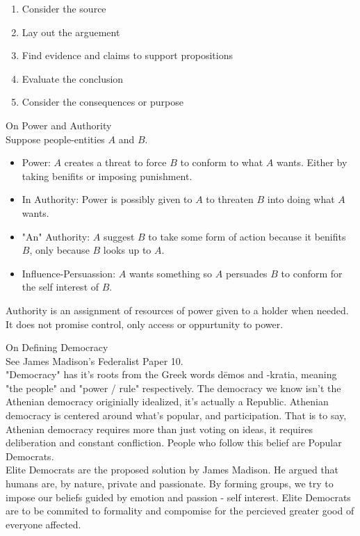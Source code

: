 \documentclass{article}
\begin{document}
\begin{enumerate}
  \item Consider the source
  \item Lay out the arguement
  \item Find evidence and claims to support propositions
  \item Evaluate the conclusion
  \item Consider the consequences or purpose
\end{enumerate}

\noindent
\Large On Power and Authority\\
\normalsize
\noindent
Suppose people-entities $A$ and $B$.

\centering
{}
\raggedright

\begin{itemize}
  \item Power: $A$ creates a threat to force $B$ to conform to what $A$ wants. Either by taking benifits or imposing punishment.
  \item In Authority: Power is possibly given to $A$ to threaten $B$ into doing what $A$ wants.
  \item "An" Authority: $A$ suggest $B$ to take some form of action because it benifits $B$, only because $B$ looks up to $A$.
  \item Influence-Persuassion: $A$ wants something so $A$ persuades $B$ to conform for the self interest of $B$.
\end{itemize}

\noindent
Authority is an assignment of resources of power given to a holder when needed. It does not promise control, only access or oppurtunity to power.

\Large On Defining Democracy\\
\normalsize
\noindent
See James Madison's Federalist Paper 10.\\

"Democracy" has it's roots from the Greek words d\={e}mos and -kratia, meaning "the people" and "power / rule" respectively. The democracy we know isn't the Athenian democracy originially idealized, it's actually a Republic. Athenian democracy is centered around what's popular, and participation. That is to say, Athenian democracy requires more than just voting on ideas, it requires deliberation and constant confliction. People who follow this belief are Popular Democrats.\\

Elite Democrats are the proposed solution by James Madison. He argued that humans are, by nature, private and passionate. By forming groups, we try to impose our beliefs guided by emotion and passion - self interest. Elite Democrats are to be commited to formality and compomise for the percieved greater good of everyone affected.
\end{document}
